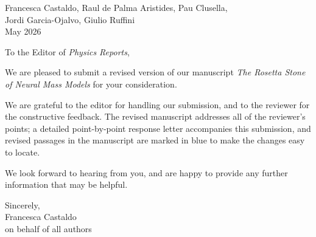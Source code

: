 \documentclass[12pt,a4paper]{article}
\begin{document}
\thispagestyle{plain}

\noindent Francesca Castaldo, Raul de Palma Aristides, Pau Clusella,\\
Jordi Garcia-Ojalvo, Giulio Ruffini\\[1.5em]

 May 2026

\bigskip

\noindent To the Editor of \textit{Physics Reports},

\bigskip

We are pleased to submit a revised version of our manuscript \emph{The Rosetta Stone of Neural Mass Models} for your consideration.

\medskip

We are grateful to the editor for handling our submission, and to the reviewer for the constructive feedback. The revised manuscript addresses all of the reviewer's points; a detailed point-by-point response letter accompanies this submission, and revised passages in the manuscript are marked in blue to make the changes easy to locate.

\medskip

We look forward to hearing from you, and are happy to provide any further information that may be helpful.

\bigskip

\noindent Sincerely,\\[1em]

\noindent Francesca Castaldo\\
on behalf of all authors
\end{document}
